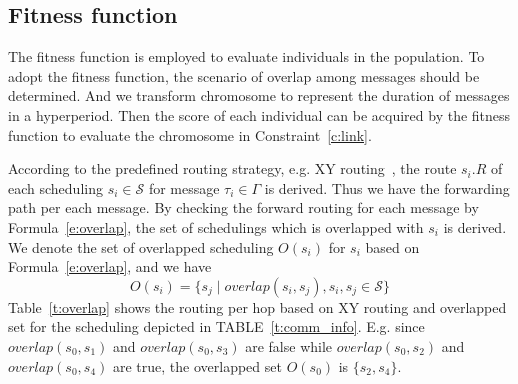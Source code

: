 \documentclass[10pt,journal]{IEEEtran}
\newcommand{\calS}{\mathcal{S}}
\theoremstyle{remark}
\begin{document}
\subsection{Fitness function \label{s:fit}}

The fitness function is employed to evaluate individuals in the population.
To adopt the fitness function, 
the scenario of overlap among messages should be determined.
And we transform chromosome to represent the duration of messages in a hyperperiod.
Then the score of each individual can be acquired by the fitness function to evaluate the chromosome in Constraint~\ref{c:link}.

According to the predefined routing strategy,
e.g. XY routing~\cite{DBLP:books/daglib/0087651},
the route $s_i.R$ of each scheduling $s_i\in \calS$ for message $\tau_i\in\Gamma$ is derived.
Thus we have the forwarding path per each message.
By checking the forward routing for each message by Formula~\ref{e:overlap},
the set of schedulings which is overlapped with $s_i$ is derived.
We denote the set of overlapped scheduling $O(s_i)$ for $s_i$ based on Formula~\ref{e:overlap},
and we have
\begin{equation}
O(s_i) = \{ s_j \mid overlap(s_i,s_j),s_i,s_j\in \calS  \}
\end{equation}
Table~\ref{t:overlap} shows the routing per hop based on XY routing and overlapped set for the scheduling depicted in TABLE~\ref{t:comm_info}.
E.g. since $overlap(s_{0},s_{1})$ and $overlap(s_{0},s_{3})$ are false while $overlap(s_{0},s_{2})$ and $overlap(s_{0},s_{4})$ are true, the overlapped set $O(s_{0})$ is $\{ s_{2},s_{4} \}$. 
\end{document}
